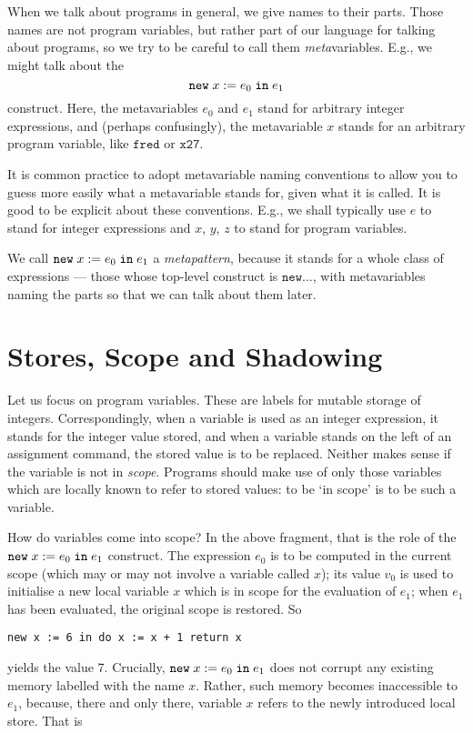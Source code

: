 \documentclass{article}
\begin{document}
When we talk about programs in general, we give names to their parts. Those names are not program variables, but rather part of our language for talking about programs, so we try to be careful to call them \emph{meta}variables. E.g., we might talk about the
\[
  \mathtt{new}\;x\;\mathtt{:=}\;e_0\;\mathtt{in}\;e_1
\]
construct. Here, the metavariables $e_0$ and $e_1$ stand for arbitrary integer expressions, and (perhaps confusingly), the metavariable $x$ stands for an arbitrary program variable, like $\mathtt{fred}$ or $\mathtt{x27}$.

It is common practice to adopt metavariable naming conventions to allow you to guess more easily what a metavariable stands for, given what it is called. It is good to be explicit about these conventions. E.g., we shall typically use $e$ to stand for integer expressions and $x$, $y$, $z$ to stand for program variables.

We call $\mathtt{new}\;x\;\mathtt{:=}\;e_0\;\mathtt{in}\;e_1$ a \emph{metapattern}, because it stands for a whole class of expressions --- those whose top-level construct is $\mathtt{new}\ldots$, with metavariables naming the parts so that we can talk about them later.


\section{Stores, Scope and Shadowing}

Let us focus on program variables. These are labels for mutable storage of integers. Correspondingly, when a variable is used as an integer expression, it stands for the integer value stored, and when a variable stands on the left of an assignment command, the stored value is to be replaced. Neither makes sense if the variable is not in \emph{scope}. Programs should make use of only those variables which are locally known to refer to stored values: to be `in scope' is to be such a variable.

How do variables come into scope? In the above fragment, that is the role of the $\mathtt{new}\;x\;\mathtt{:=}\;e_0\;\mathtt{in}\;e_1$ construct. The expression $e_0$ is to be computed in the current scope (which may or may not involve a variable called $x$); its value $v_0$ is used to initialise a new local variable $x$ which is in scope for the evaluation of $e_1$; when $e_1$ has been evaluated, the original scope is restored. So

\begin{verbatim}
new x := 6 in do x := x + 1 return x
\end{verbatim}

yields the value 7. Crucially, $\mathtt{new}\;x\;\mathtt{:=}\;e_0\;\mathtt{in}\;e_1$ does not corrupt any existing memory labelled with the name $x$. Rather, such memory becomes inaccessible to $e_1$, because, there and only there, variable $x$ refers to the newly introduced local store. That is
\end{document}
